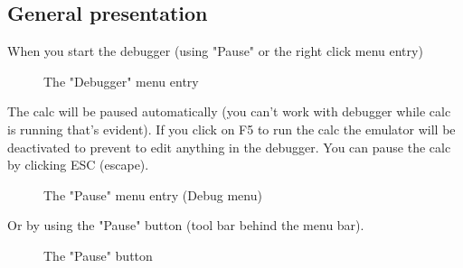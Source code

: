 \documentclass[10pt]{report}
\begin{document}
\subsection{General presentation}

When you start the debugger (using "Pause" or the right click menu entry) 
\begin{figure}[H]
\centering
{}
\caption{The "Debugger" menu entry}
\end{figure}

The calc will be paused automatically (you can't work with debugger while calc is running that's evident).\newline
If you click on F5 to run the calc the emulator will be deactivated to prevent to edit anything in the debugger.\newline
You can pause the calc by clicking ESC (escape).\newline
\begin{figure}[H]
\centering
{}
\caption{The "Pause" menu entry (Debug menu)}
\end{figure}

Or by using the "Pause" button (tool bar behind the menu bar).\newline
\begin{figure}[H]
\centering
{}
\caption{The "Pause" button}
\end{figure}
\end{document}
